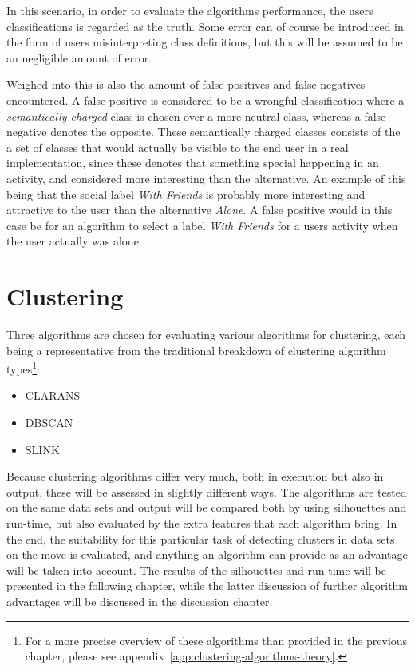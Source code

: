 In this scenario, in order to evaluate the algorithms performance, the 
users classifications is regarded as the truth. Some error can of course
be introduced in the form of users misinterpreting class definitions, but
this will be assumed to be an negligible amount of error.

Weighed into this is also the amount of false positives and false negatives
encountered. A false positive is considered to be a wrongful classification
where a \emph{semantically charged} class is chosen over a more neutral class, 
whereas a false negative denotes the opposite. These semantically charged
classes consists of the a set of classes that would actually be visible to 
the end user in a real implementation, since these denotes that something 
special happening in an activity, and considered more interesting than the
alternative. An example of this being that the social label 
\emph{With Friends} is probably more interesting and attractive to the user 
than the alternative \emph{Alone}. A false positive would in this case 
be for an algorithm to select a label \emph{With Friends} for a users
activity when the user actually was alone. 

\section{Clustering}

Three algorithms are chosen for evaluating various algorithms for clustering, 
each being a representative from the traditional breakdown of clustering 
algorithm types\footnote{
    For a more precise overview of these algorithms than provided in the
    previous chapter, please see 
    appendix~\ref{app:clustering-algorithms-theory}. }:
\begin{itemize}
    \item CLARANS
    \item DBSCAN
    \item SLINK
\end{itemize}

Because clustering algorithms differ very much, both in execution but also in 
output, these will be assessed in slightly different ways. The algorithms are
tested on the same data sets and output will be compared both by using 
silhouettes and run-time, but also evaluated by the extra features that each 
algorithm bring. In the end, the suitability for this particular task of 
detecting clusters in data sets on the move is evaluated, and anything an 
algorithm can provide as an advantage will be taken into account. The results
of the silhouettes and run-time will be presented in the following chapter,
while the latter discussion of further algorithm advantages will be discussed
in the discussion chapter. 

